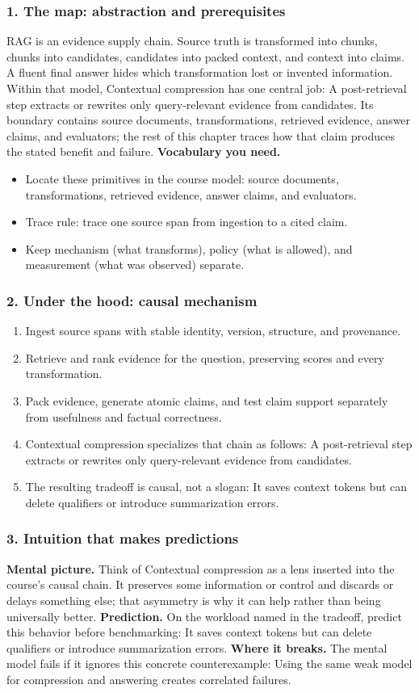 \subsubsection*{1. The map: abstraction and prerequisites}
RAG is an evidence supply chain. Source truth is transformed into chunks, chunks into candidates, candidates into packed context, and context into claims. A fluent final answer hides which transformation lost or invented information.
Within that model, Contextual compression has one central job: A post-retrieval step extracts or rewrites only query-relevant evidence from candidates. Its boundary contains source documents, transformations, retrieved evidence, answer claims, and evaluators; the rest of this chapter traces how that claim produces the stated benefit and failure.
\textbf{Vocabulary you need.}\begin{itemize}
\item Locate these primitives in the course model: source documents, transformations, retrieved evidence, answer claims, and evaluators.
\item Trace rule: trace one source span from ingestion to a cited claim.
\item Keep mechanism (what transforms), policy (what is allowed), and measurement (what was observed) separate.
\end{itemize}
\subsubsection*{2. Under the hood: causal mechanism}\begin{enumerate}
\item Ingest source spans with stable identity, version, structure, and provenance.
\item Retrieve and rank evidence for the question, preserving scores and every transformation.
\item Pack evidence, generate atomic claims, and test claim support separately from usefulness and factual correctness.
\item Contextual compression specializes that chain as follows: A post-retrieval step extracts or rewrites only query-relevant evidence from candidates.
\item The resulting tradeoff is causal, not a slogan: It saves context tokens but can delete qualifiers or introduce summarization errors.
\end{enumerate}
\subsubsection*{3. Intuition that makes predictions}
\textbf{Mental picture.} Think of Contextual compression as a lens inserted into the course's causal chain. It preserves some information or control and discards or delays something else; that asymmetry is why it can help rather than being universally better.
\textbf{Prediction.} On the workload named in the tradeoff, predict this behavior before benchmarking: It saves context tokens but can delete qualifiers or introduce summarization errors.
\textbf{Where it breaks.} The mental model fails if it ignores this concrete counterexample: Using the same weak model for compression and answering creates correlated failures.
